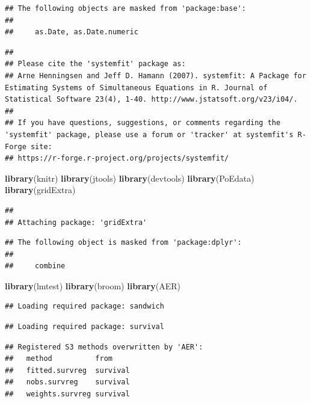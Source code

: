 \documentclass[]{article}
\newenvironment{Shaded}{\begin{snugshade}}{\end{snugshade}}
\newcommand{\KeywordTok}[1]{\textcolor[rgb]{0.13,0.29,0.53}{\textbf{#1}}}
\newcommand{\NormalTok}[1]{#1}
\begin{document}
\begin{verbatim}
## The following objects are masked from 'package:base':
## 
##     as.Date, as.Date.numeric
\end{verbatim}

\begin{verbatim}
## 
## Please cite the 'systemfit' package as:
## Arne Henningsen and Jeff D. Hamann (2007). systemfit: A Package for Estimating Systems of Simultaneous Equations in R. Journal of Statistical Software 23(4), 1-40. http://www.jstatsoft.org/v23/i04/.
## 
## If you have questions, suggestions, or comments regarding the 'systemfit' package, please use a forum or 'tracker' at systemfit's R-Forge site:
## https://r-forge.r-project.org/projects/systemfit/
\end{verbatim}

\begin{Shaded}
\begin{Highlighting}[]
\KeywordTok{library}\NormalTok{(knitr)}
\KeywordTok{library}\NormalTok{(jtools)}
\KeywordTok{library}\NormalTok{(devtools)}
\KeywordTok{library}\NormalTok{(PoEdata)}
\KeywordTok{library}\NormalTok{(gridExtra)}
\end{Highlighting}
\end{Shaded}

\begin{verbatim}
## 
## Attaching package: 'gridExtra'
\end{verbatim}

\begin{verbatim}
## The following object is masked from 'package:dplyr':
## 
##     combine
\end{verbatim}

\begin{Shaded}
\begin{Highlighting}[]
\KeywordTok{library}\NormalTok{(lmtest)}
\KeywordTok{library}\NormalTok{(broom)}
\KeywordTok{library}\NormalTok{(AER)}
\end{Highlighting}
\end{Shaded}

\begin{verbatim}
## Loading required package: sandwich
\end{verbatim}

\begin{verbatim}
## Loading required package: survival
\end{verbatim}

\begin{verbatim}
## Registered S3 methods overwritten by 'AER':
##   method          from    
##   fitted.survreg  survival
##   nobs.survreg    survival
##   weights.survreg survival
\end{verbatim}
\end{document}
